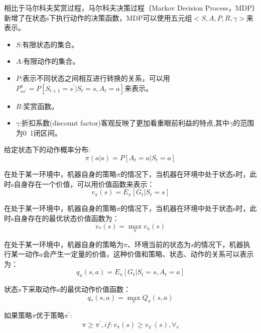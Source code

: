 \begin{defn}[马尔科夫决策过程]
  相比于马尔科夫奖赏过程，马尔科夫决策过程（Markov Decision Process，MDP）新增了在状态s下执行动作的决策函数，MDP可以使用五元组$<S,A,P,R,\gamma>$来表示。
  \begin{itemize}
    \item $S$:有限状态的集合。
    \item $A$:有限动作的集合。
    \item $P$:表示不同状态之间相互进行转换的关系，可以用$P_{ss^{'}}^a=P[S_{t+1}=s^{'}|S_t=s,A_t=a]$来表示。
    \item $R$:奖赏函数。
    \item $\gamma$:折扣系数(discount factor)客观反映了更加看重眼前利益的特点,其中$\gamma$的范围为0~1闭区间。
  \end{itemize}
\end{defn}

\begin{defn}[策略]
  给定状态下的动作概率分布:
  \begin{equation}
    \pi(a|s)=P[A_t=a|S_t=a]
  \end{equation}  
\end{defn}
\begin{defn}[状态价值函数]
  在处于某一环境中，机器自身的策略$\pi$的情况下，当机器在环境中处于状态s时，此时s自身存在一个价值，可以用价值函数来表示：
  \begin{equation}
    v_{\pi}(s)=E_{\pi}[G_t|S_t=s]
  \end{equation}
\end{defn}
\begin{defn}[最优状态价值函数]
  在处于某一环境中，机器自身的策略$\pi$的情况下，当机器在环境中处于状态s时，此时s自身存在的最优状态价值函数为：
  \begin{equation}
    v_{*}(s)=\max_{\pi}v_{\pi}(s)
  \end{equation}
\end{defn}
\begin{defn}[动作价值函数]
  在处于某一环境中，机器自身的策略为$\pi$、环境当前的状态为$s$的情况下，机器执行某一动作$a$会产生一定量的价值，这种价值和策略、状态、动作的关系可以表示为：
  \begin{equation}
    q_{\pi}(s,a)=E_{\pi}[G_t|S_t=s,A_t=a]
  \end{equation}
\end{defn}
\begin{defn}[最优动作价值函数]
  状态$s$下采取动作$a$的最优动作价值函数：
  \begin{equation}
    q_{*}(s,a)=\max_{\pi}Q_{\pi}(s,a)
  \end{equation}
\end{defn}
\begin{defn}[最优策略]
  如果策略$\pi$优于策略$\pi^{'}$:
  \begin{equation}
    \pi \geq \pi^{'} , if: v_{\pi}(s) \geq v_{\pi^{'}}(s),\forall_{s}
  \end{equation}
    
\end{defn}

